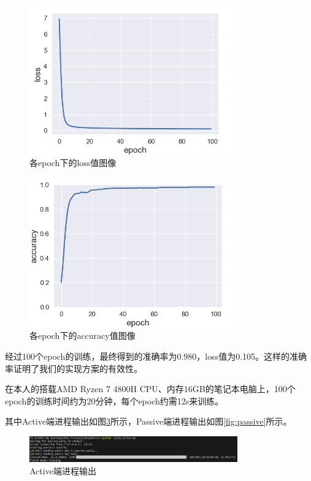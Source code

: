 \documentclass[twoside,11pt]{article}
\begin{document}
\begin{figure}[htbp]
    \centering
    \includegraphics[width=0.8\textwidth]{pic/loss-plot.png}
    \caption{各epoch下的loss值图像}
    \label{fig:loss}
\end{figure}

\begin{figure}[htbp]
    \centering
    \includegraphics[width=0.8\textwidth]{pic/accuracy-plot.png}
    \caption{各epoch下的accuracy值图像}
    \label{fig:acc}
\end{figure}

经过100个epoch的训练，最终得到的准确率为0.980，loss值为0.105。这样的准确率证明了我们的实现方案的有效性。

在本人的搭载AMD Ryzen 7 4800H CPU、内存16GB的笔记本电脑上，100个epoch的训练时间约为20分钟，每个epoch约需12s来训练。

其中Active端进程输出如图\ref{fig:active}所示，Passive端进程输出如图\ref{fig:passive}所示。

\begin{figure}[htbp]
    \centering
    \includegraphics[width=0.8\textwidth]{pic/active-output.png}
    \caption{Active端进程输出}
    \label{fig:active}
\end{figure}
\end{document}
